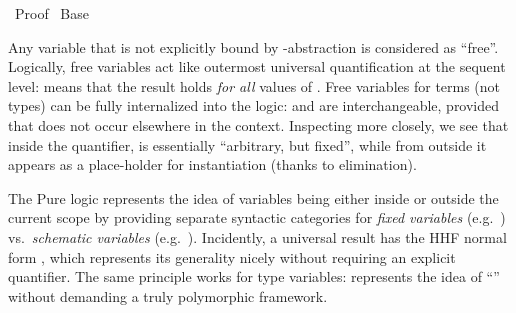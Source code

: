 %
\begin{isabellebody}%
\def\isabellecontext{Proof}%
%
\isadelimtheory
%
\endisadelimtheory
%
\isatagtheory
{}\isamarkupfalse%
\ Proof\isanewline
{}\ Base\isanewline
{}%
\endisatagtheory
{\isafoldtheory}%
%
\isadelimtheory
%
\endisadelimtheory
%
\isamarkuptrue%
%
\isamarkuptrue%
%
\begin{isamarkuptext}%
Any variable that is not explicitly bound by \isa{{\isasymlambda}}-abstraction
  is considered as ``free''.  Logically, free variables act like
  outermost universal quantification at the sequent level:  means that the result
  holds \emph{for all} values of .  Free variables for
  terms (not types) can be fully internalized into the logic:  and  are interchangeable, provided
  that  does not occur elsewhere in the context.
  Inspecting  more closely, we see that inside the
  quantifier,  is essentially ``arbitrary, but fixed'',
  while from outside it appears as a place-holder for instantiation
  (thanks to \isa{{\isasymAnd}} elimination).

  The Pure logic represents the idea of variables being either inside
  or outside the current scope by providing separate syntactic
  categories for \emph{fixed variables} (e.g.\ ) vs.\
  \emph{schematic variables} (e.g.\ ).  Incidently, a
  universal result  has the HHF normal form , which represents its generality nicely without requiring
  an explicit quantifier.  The same principle works for type
  variables:  represents the idea of ``'' without demanding a truly polymorphic framework.


\end{isamarkuptext}
\end{isabellebody}
